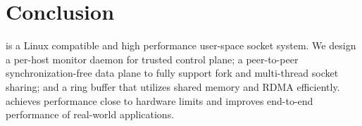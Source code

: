 \section{Conclusion}
\label{socksdirect:sec:conclusion}

\sys{} is a Linux compatible and high performance user-space socket system.
We design a per-host monitor daemon for trusted control plane;
a peer-to-peer synchronization-free data plane to fully support fork and multi-thread socket sharing;
and a ring buffer that utilizes shared memory and RDMA efficiently.
\sys{} achieves performance close to hardware limits and improves end-to-end performance of real-world applications.

